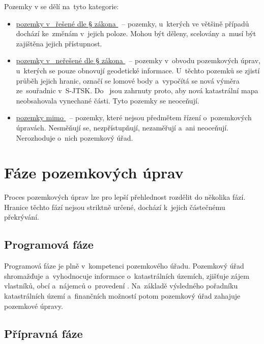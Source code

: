 Pozemky v  se dělí na~tyto kategorie:
\vspace{-\topsep}
	\begin{itemize}[leftmargin=1.5cm, noitemsep]
        \item \underline{pozemky v~ řešené dle § zákona
          \citep{pu_zakon}}~– pozemky, u~kterých ve většině případů
          dochází ke~změnám v~jejich poloze. Mohou být děleny,
          scelovány a~musí být zajištěna jejich přístupnost.
        \item \underline{pozemky v~ neřešené dle § zákona
          \citep{pu_zakon}}~– pozemky v~obvodu pozem\-kových úprav,
          u~kterých se pouze obnovují geodetické informace.
          U~těchto pozemků se zjistí průběh jejich hranic, označí
          se lomové body a~vypočítá se nová výměra ze~souřadnic
          v~S-JTSK. Do~ jsou zahrnuty proto, aby nová
          katastrální mapa neobsahovala vynechané části. Tyto
          pozemky se neoceňují.
        \item \underline{pozemky mimo }~– pozemky, které
          nejsou předmětem řízení o~pozem\-kových úpravách. Nesměňují
          se, nezpřístupňují, nezaměřují a~ani neoceňují. Nerozhoduje
          o~nich pozemkový úřad.
	\end{itemize}

\section{Fáze pozemkových úprav}
\label{etapy_pu}

Proces pozemkových úprav lze pro lepší přehlednost rozdělit
do několika fází. Hra\-nice těchto fází nejsou striktně určené, dochází
k~jejich částečnému překrývání.

\subsection{Programová fáze}
\label{programova_faze}

Programová fáze je plně v~kompetenci pozemkového úřadu. Pozemkový úřad
shromažďuje a~vyhodnocuje informace o~katastrálních územích, zjišťuje
zájem vlastníků, obcí a~nájemců o~provedení . Na~základě
výsledného pořadníku katastrálních území a~finančních možností potom
pozemkový úřad zahajuje pozemkové úpravy.

\subsection{Přípravná fáze}
\label{pripravna_faze}

